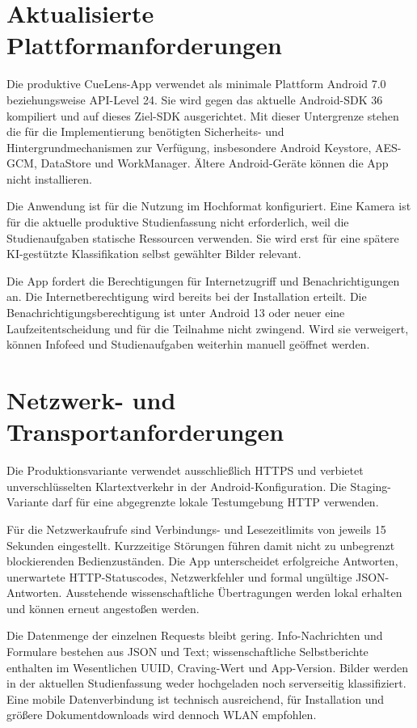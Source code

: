 
\section{Aktualisierte Plattformanforderungen}

Die produktive CueLens-App verwendet als minimale Plattform Android 7.0 beziehungsweise API-Level 24. Sie wird gegen das aktuelle Android-SDK 36 kompiliert und auf dieses Ziel-SDK ausgerichtet. Mit dieser Untergrenze stehen die für die Implementierung benötigten Sicherheits- und Hintergrundmechanismen zur Verfügung, insbesondere Android Keystore, AES-GCM, DataStore und WorkManager. Ältere Android-Geräte können die App nicht installieren.

Die Anwendung ist für die Nutzung im Hochformat konfiguriert. Eine Kamera ist für die aktuelle produktive Studienfassung nicht erforderlich, weil die Studienaufgaben statische Ressourcen verwenden. Sie wird erst für eine spätere KI-gestützte Klassifikation selbst gewählter Bilder relevant.

Die App fordert die Berechtigungen für Internetzugriff und Benachrichtigungen an. Die Internetberechtigung wird bereits bei der Installation erteilt. Die Benachrichtigungsberechtigung ist unter Android 13 oder neuer eine Laufzeitentscheidung und für die Teilnahme nicht zwingend. Wird sie verweigert, können Infofeed und Studienaufgaben weiterhin manuell geöffnet werden.

\section{Netzwerk- und Transportanforderungen}

Die Produktionsvariante verwendet ausschließlich HTTPS und verbietet unverschlüsselten Klartextverkehr in der Android-Konfiguration. Die Staging-Variante darf für eine abgegrenzte lokale Testumgebung HTTP verwenden.

Für die Netzwerkaufrufe sind Verbindungs- und Lesezeitlimits von jeweils 15 Sekunden eingestellt. Kurzzeitige Störungen führen damit nicht zu unbegrenzt blockierenden Bedienzuständen. Die App unterscheidet erfolgreiche Antworten, unerwartete HTTP-Statuscodes, Netzwerkfehler und formal ungültige JSON-Antworten. Ausstehende wissenschaftliche Übertragungen werden lokal erhalten und können erneut angestoßen werden.

Die Datenmenge der einzelnen Requests bleibt gering. Info-Nachrichten und Formulare bestehen aus JSON und Text; wissenschaftliche Selbstberichte enthalten im Wesentlichen UUID, Craving-Wert und App-Version. Bilder werden in der aktuellen Studienfassung weder hochgeladen noch serverseitig klassifiziert. Eine mobile Datenverbindung ist technisch ausreichend, für Installation und größere Dokumentdownloads wird dennoch WLAN empfohlen.

